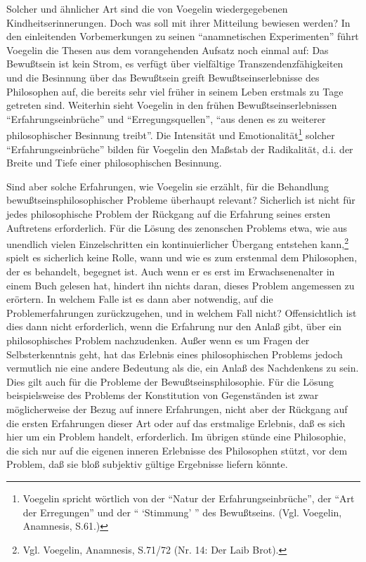 Solcher und ähnlicher Art sind die von Voegelin wiedergegebenen
Kindheitserinnerungen. Doch was soll mit ihrer Mitteilung bewiesen werden? In
den einleitenden Vorbemerkungen zu seinen "`anamnetischen Experimenten"' führt
Voegelin die Thesen aus dem vorangehenden Aufsatz noch einmal auf: Das
Bewußtsein ist kein Strom, es verfügt über vielfältige Transzendenzfähigkeiten
und die Besinnung über das Bewußtsein greift Bewußtseinserlebnisse des
Philosophen auf, die bereits sehr viel früher in seinem Leben erstmals zu
Tage getreten sind. Weiterhin sieht Voegelin in den frühen
Bewußtseinserlebnissen "`Erfahrungseinbrüche"' und "`Erregungsquellen"', "`aus
denen es zu weiterer philosophischer Besinnung treibt"'. Die Intensität und
Emotionalität\footnote{Voegelin spricht wörtlich von der "`Natur der
  Erfahrungseinbrüche"', der "`Art der Erregungen"' und der "` `Stimmung' "'
  des Bewußtseins. (Vgl. Voegelin, Anamnesis, S.61.)} solcher
"`Erfahrungseinbrüche"' bilden für Voegelin den Maßstab der Radikalität, d.i.
der Breite und Tiefe einer philosophischen Besinnung.

Sind aber solche Erfahrungen, wie Voegelin sie erzählt, für die Behandlung
bewußtseinsphilosophischer Probleme überhaupt relevant? Sicherlich ist nicht
für jedes philosophische Problem der Rückgang auf die Erfahrung seines ersten
Auftretens erforderlich. Für die Lösung des zenonschen Problems etwa, wie aus
unendlich vielen Einzelschritten ein kontinuierlicher Übergang entstehen
kann,\footnote{Vgl. Voegelin, Anamnesis, S.71/72 (Nr. 14: Der Laib Brot).}
spielt es sicherlich keine Rolle, wann und wie es zum erstenmal dem
Philosophen, der es behandelt, begegnet ist.  Auch wenn er es erst im
Erwachsenenalter in einem Buch gelesen hat, hindert ihn nichts daran, dieses
Problem angemessen zu erörtern. In welchem Falle ist es dann aber notwendig,
auf die Problemerfahrungen zurückzugehen, und in welchem Fall nicht?
Offensichtlich ist dies dann nicht erforderlich, wenn die Erfahrung nur den
Anlaß gibt, über ein philosophisches Problem nachzudenken. Außer wenn es um
Fragen der Selbsterkenntnis geht, hat das Erlebnis eines philosophischen
Problems jedoch vermutlich nie eine andere Bedeutung als die, ein Anlaß des
Nachdenkens zu sein. Dies gilt auch für die Probleme der
Bewußtseinsphilosophie. Für die Lösung beispielsweise des Problems der
Konstitution von Gegenständen ist zwar möglicherweise der Bezug auf innere
Erfahrungen, nicht aber der Rückgang auf die ersten Erfahrungen dieser Art
oder auf das erstmalige Erlebnis, daß es sich hier um ein Problem handelt,
erforderlich. Im übrigen stünde eine Philosophie, die sich nur auf die eigenen
inneren Erlebnisse des Philosophen stützt, vor dem Problem, daß sie bloß
subjektiv gültige Ergebnisse liefern könnte.

